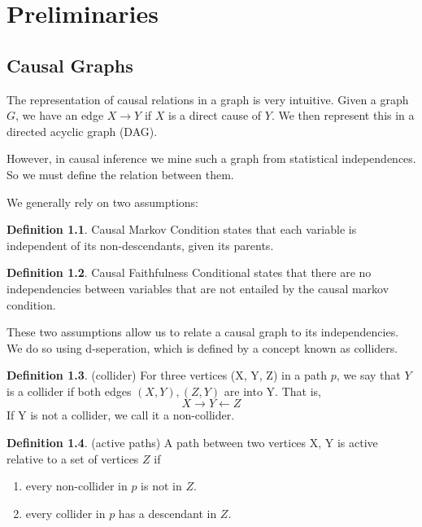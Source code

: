 \documentclass[11pt,a4paper]{report}
\theoremstyle{definition}
\newtheorem{defn}{Definition}[section]
\begin{document}
\chapter{Preliminaries}\label{preliminaries}

\section{Causal Graphs}
The representation of causal relations in a graph is very intuitive. Given
a graph $G$, we have an edge $X \rightarrow Y$ if $X$ is a direct cause of
$Y$. We then represent this in a directed acyclic graph (DAG).

However, in causal inference we mine such a graph from statistical
independences. So we must define the relation between them.

We generally rely on two assumptions:

\begin{defn}
  Causal Markov Condition states that each variable is independent of its
  non-descendants, given its parents.
\end{defn}

\begin{defn}
  Causal Faithfulness Conditional states that there are no independencies
  between variables that are not entailed by the causal markov condition.
\end{defn}

These two assumptions allow us to relate a causal graph to its
independencies. We do so using d-seperation, which is defined by a concept
known as colliders.

\begin{defn}\label{def:collider}(collider)
  For three vertices (X, Y, Z) in a path $p$, we say that $Y$ is a collider
  if both edges $(X, Y), (Z, Y)$ are into Y. That is,
  \begin{equation*}
    X \rightarrow Y \leftarrow Z
  \end{equation*}
  If Y is not a collider, we call it a non-collider.
\end{defn}

\begin{defn}(active paths)
  A path between two vertices X, Y is active relative to a set of vertices
  $Z$ if
  \begin{enumerate}
    \item every non-collider in $p$ is not in $Z$.

    \item every collider in $p$ has a descendant in $Z$.
  \end{enumerate}
\end{defn}
\end{document}
